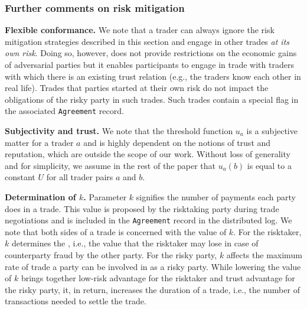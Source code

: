 
\subsubsection{Further comments on risk mitigation}

\textbf{Flexible conformance.} We note that a trader can always ignore the risk mitigation strategies described in this section and engage in other trades \emph{at its own risk}.
Doing so, however, does not provide restrictions on the economic gains of adversarial parties but it enables participants to engage in trade with traders with which there is an existing trust relation (e.g., the traders know each other in real life).
Trades that parties started at their own risk do not impact the obligations of the risky party in such trades.
Such trades contain a special flag in the associated \texttt{Agreement} record.

\textbf{Subjectivity and trust.} We note that the threshold function $ u_a $ is a subjective matter for a trader $ a $ and is highly dependent on the notions of trust and reputation, which are outside the scope of our work.
Without loss of generality and for simplicity, we assume in the rest of the paper that $ u_a(b) $ is equal to a constant $ U $ for all trader pairs $ a $ and $ b $.

\textbf{Determination of $ k $.} 
Parameter $ k $ signifies the number of payments each party does in a trade.
This value is proposed by the risktaking party during trade negotiations and is included in the \texttt{Agreement} record in the distributed log.
We note that both sides of a trade is concerned with the value of $ k $.
For the risktaker, $ k $ determines the \MarginalStake{}, i.e., the value that the risktaker may lose in case of counterparty fraud by the other party.
For the risky party, $ k $ affects the maximum rate of trade a party can be involved in as a risky party.
While lowering the value of $ k $ brings together low-risk advantage for the risktaker and trust advantage for the risky party, it, in return, increases the duration of a trade, i.e., the number of transactions needed to settle the trade.

